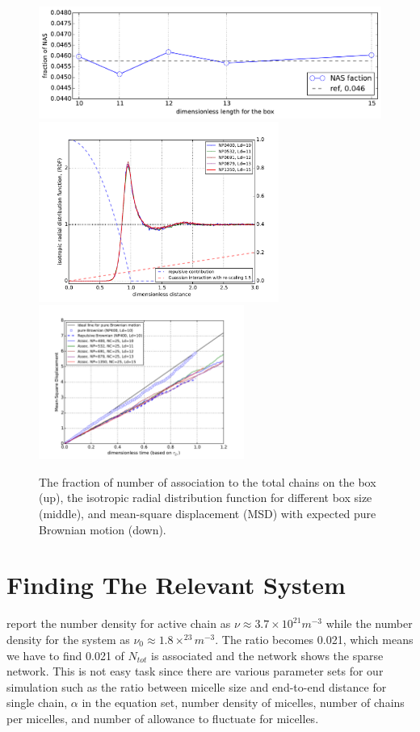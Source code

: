 \documentclass[10pt, a4paper]{article}
\begin{document}
\begin{figure}
  \centering
  \includegraphics[width=\textwidth]{figures/plt_NAS_timestep.pdf}\\
  \includegraphics[width=0.7\textwidth]{figures/RDF_boxsize.pdf}\\
  \includegraphics[width=0.6\textwidth]{figures/MSD_compare_LD.pdf}
  \caption{The fraction of number of association to the total chains on the box (up), the isotropic radial distribution function for different box size (middle), and mean-square displacement (MSD) with expected pure Brownian motion (down).}
  \label{fig:size_effect}
\end{figure}

\section{Finding The Relevant System}
\textcite{Suzuki:2012gfa} report the number density for active chain as $\nu \approx 3.7 \times 10^21 m^{-3}$ while the number density for the system as $\nu_0 \approx 1.8\times^{23}m^{-3}$. The ratio becomes 0.021, which means we have to find 0.021 of $N_{tot}$ is associated and the network shows the sparse network. This is not easy task since there are various parameter sets for our simulation such as the ratio between micelle size and end-to-end distance for single chain, $\alpha$ in the equation set, number density of micelles, number of chains per micelles, and number of allowance to fluctuate for micelles.
\end{document}
